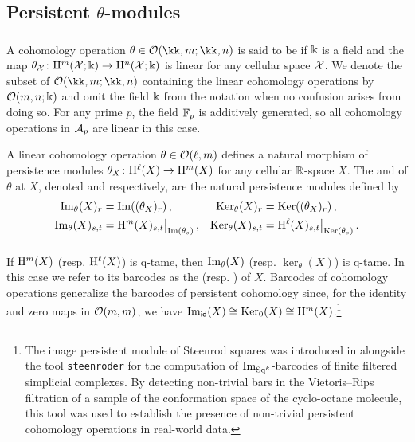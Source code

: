 
\subsection{Persistent $\theta$-modules}

\subsubsection{}\label{ss:theta-modules}

A cohomology operation $\theta \in \cO(\kk,m; \kk,n)$ is said to be  if $\Bbbk$ is a field and the map $\theta_{\mathcal{X}} \colon \mathrm{H}^m(\mathcal{X}; \Bbbk) \to \mathrm{H}^n(\mathcal{X}; \Bbbk)$ is linear for any cellular space $\mathcal{X}$.
We denote the subset of $\cO(\kk,m; \kk,n)$ containing the linear cohomology operations by $\mathcal{O}(m,n;\Bbbk)$ and omit the field \(\Bbbk\) from the notation when no confusion arises from doing so.
For any prime $p$, the field ${\mathbb{F}_p}$ is additively generated, so all cohomology operations in $\mathcal{A}_p$ are linear in this case.

A linear cohomology operation \(\theta \in \mathcal{O}(\ell,m)\) defines a natural morphism of persistence modules $\theta_X \colon \mathrm{H}^\ell(X) \to \mathrm{H}^m(X)$ for any cellular $\mathbb{R}$-space $X$.
The  and  of $\theta$ at \(X\), denoted  and  respectively, are the natural persistence modules defined by
\begin{align*}
	\operatorname{Im}_\theta(X)_r &= \operatorname{Im}((\theta_X)_r)\,, &
	\operatorname{Ker}_\theta(X)_r &= \operatorname{Ker}((\theta_X)_r)\,, \\
	\operatorname{Im}_\theta(X)_{s,t} &= \mathrm{H}^m(X)_{s,t}\big|_{\operatorname{Im}(\theta_s)}\,, &
	\operatorname{Ker}_\theta(X)_{s,t} &= \mathrm{H}^\ell(X)_{s,t}\big|_{\operatorname{Ker}(\theta_s)}\,.
\end{align*}

\subsubsection{}\label{ss:theta-modules-q-tame}

If $\mathrm{H}^m(X)$ (resp. \(\mathrm{H}^\ell(X)\)) is q-tame, then $\operatorname{Im}_\theta(X)$ (resp. $\ker_\theta(X)$) is q-tame.
In this case we refer to its barcodes as the  (resp. ) of \(X\).
Barcodes of cohomology operations generalize the barcodes of persistent cohomology since, for the identity and zero maps in $\mathcal{O}(m,m)$, we have $\operatorname{Im}_{\mathsf{id}}(X) \cong \operatorname{Ker}_0(X) \cong \mathrm{H}^m(X)$.\footnote{
The image persistent module of Steenrod squares was introduced in \cite{medina2022per_st} alongside the tool \texttt{steenroder} for the computation of \(\operatorname{Im}_{\mathrm{Sq}^k}\)-barcodes of finite filtered simplicial complexes.
By detecting non-trivial bars in the Vietoris--Rips filtration of a sample of the conformation space of the cyclo-octane molecule, this tool was used to establish the presence of non-trivial persistent cohomology operations in real-world data.}